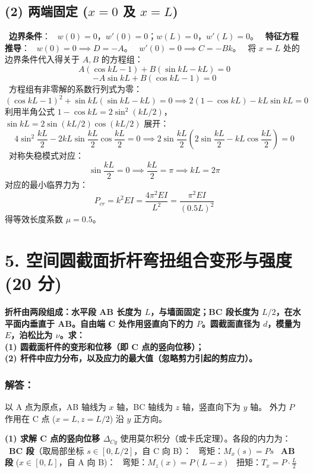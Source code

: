 \documentclass[11pt,a4paper]{ctexrep}
\begin{document}
{\subsection*{(2) 两端固定 ($x=0$ 及 $x=L$)}
\noindent\textbullet\ \textbf{边界条件}：
\noindent\textbullet\ $w(0) = 0$，$w'(0) = 0$；$w(L) = 0$，$w'(L) = 0$。
\noindent\textbullet\ \textbf{特征方程推导}：
\noindent\textbullet\ $w(0) = 0 \implies D = -A$。
\noindent\textbullet\ $w'(0) = 0 \implies C = -B k$。
\noindent\textbullet\ 将 $x=L$ 处的边界条件代入得关于 $A, B$ 的方程组：
    \[
    A(\cos kL - 1) + B(\sin kL - kL) = 0
    \]
    \[
    -A \sin kL + B(\cos kL - 1) = 0
    \]
\noindent\textbullet\ 方程组有非零解的系数行列式为零：
    \[
    (\cos kL - 1)^2 + \sin kL(\sin kL - kL) = 0 \implies 2(1 - \cos kL) - kL \sin kL = 0
    \]
    利用半角公式 $1-\cos kL = 2\sin^2(kL/2)$，$\sin kL = 2\sin(kL/2)\cos(kL/2)$ 展开：
    \[
    4 \sin^2 \frac{kL}{2} - 2 kL \sin \frac{kL}{2} \cos \frac{kL}{2} = 0 \implies 2 \sin \frac{kL}{2} \left( 2 \sin \frac{kL}{2} - kL \cos \frac{kL}{2} \right) = 0
    \]
\noindent\textbullet\ 对称失稳模式对应：
    \[
    \sin \frac{kL}{2} = 0 \implies \frac{kL}{2} = \pi \implies kL = 2\pi
    \]
    对应的最小临界力为：
    \[
    P_{cr} = k^2 EI = \frac{4 \pi^2 EI}{L^2} = \frac{\pi^2 EI}{(0.5 L)^2}
    \]
  得等效长度系数 $\mu = 0.5$。




\section*{5. 空间圆截面折杆弯扭组合变形与强度 (20 分)}

\textbf{折杆由两段组成：水平段 AB 长度为 $L$，与墙面固定；BC 段长度为 $L/2$，在水平面内垂直于 AB。自由端 C 处作用竖直向下的力 $P$。圆截面直径为 $d$，模量为 $E$，泊松比为 $\nu$。求：\\
(1) 圆截面杆件的变形和位移（即 C 点的竖向位移）；\\
(2) 杆件中应力分布，以及应力的最大值（忽略剪力引起的剪应力）。}

\subsubsection*{解答：}

以 A 点为原点，AB 轴线为 $x$ 轴，BC 轴线为 $z$ 轴，竖直向下为 $y$ 轴。
外力 $P$ 作用在 C 点 ($x=L, z=L/2$) 沿 $y$ 正方向。

\textbf{(1) 求解 C 点的竖向位移 $\Delta_{Cy}$}
使用莫尔积分（或卡氏定理）。各段的内力为：
\noindent\textbullet\ \textbf{BC 段}（取局部坐标 $s \in [0, L/2]$，自 C 向 B）：
\noindent\textbullet\ 弯矩：$M_x(s) = P s$
\noindent\textbullet\ \textbf{AB 段} ($x \in [0, L]$，自 A 向 B)：
\noindent\textbullet\ 弯矩：$M_z(x) = P(L-x)$
\noindent\textbullet\ 扭矩：$T_x = P \cdot \frac{L}{2}$

}
\end{document}
